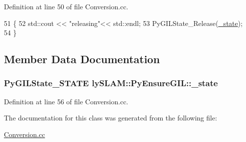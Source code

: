 Definition at line 50 of file Conversion.\+cc.


\begin{DoxyCode}
51     \{
52         std::cout << \textcolor{stringliteral}{"releasing"}<< std::endl;
53         PyGILState\_Release(\hyperlink{classlySLAM_1_1PyEnsureGIL_ade2080afcd63201ae95bb0eb5bfd3696}{\_state});
54     \}
\end{DoxyCode}


\subsection{Member Data Documentation}
\subsubsection[{\texorpdfstring{\+\_\+state}{_state}}]{\setlength{\rightskip}{0pt plus 5cm}Py\+G\+I\+L\+State\+\_\+\+S\+T\+A\+TE ly\+S\+L\+A\+M\+::\+Py\+Ensure\+G\+I\+L\+::\+\_\+state\hspace{0.3cm}{\ttfamily [private]}}\hypertarget{classlySLAM_1_1PyEnsureGIL_ade2080afcd63201ae95bb0eb5bfd3696}{}\label{classlySLAM_1_1PyEnsureGIL_ade2080afcd63201ae95bb0eb5bfd3696}


Definition at line 56 of file Conversion.\+cc.



The documentation for this class was generated from the following file\+:\begin{DoxyCompactItemize}
\item 
\hyperlink{Conversion_8cc}{Conversion.\+cc}\end{DoxyCompactItemize}
